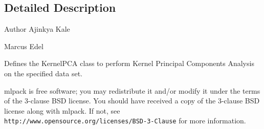\subsection{Detailed Description}
\begin{DoxyAuthor}{Author}
Ajinkya Kale 

Marcus Edel
\end{DoxyAuthor}
Defines the Kernel\+P\+CA class to perform Kernel Principal Components Analysis on the specified data set.

mlpack is free software; you may redistribute it and/or modify it under the terms of the 3-\/clause B\+SD license. You should have received a copy of the 3-\/clause B\+SD license along with mlpack. If not, see {\tt http\+://www.\+opensource.\+org/licenses/\+B\+S\+D-\/3-\/\+Clause} for more information. 